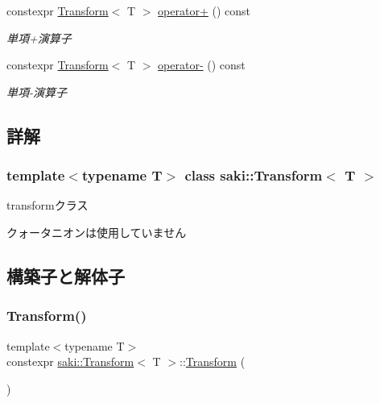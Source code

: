 \begin{DoxyCompactItemize}
constexpr \mbox{\hyperlink{classsaki_1_1_transform}{Transform}}$<$ T $>$ \mbox{\hyperlink{classsaki_1_1_transform_a52201fc4aed19cc0459dc4b3c21c3d37}{operator+}} () const
\begin{DoxyCompactList}\small\item\em 単項+演算子 \end{DoxyCompactList}\item 
constexpr \mbox{\hyperlink{classsaki_1_1_transform}{Transform}}$<$ T $>$ \mbox{\hyperlink{classsaki_1_1_transform_a813e5118f0a23213b21a6b7f101a4584}{operator-\/}} () const
\begin{DoxyCompactList}\small\item\em 単項-\/演算子 \end{DoxyCompactList}\end{DoxyCompactItemize}


\subsection{詳解}
\subsubsection*{template$<$typename T$>$\newline
class saki\+::\+Transform$<$ T $>$}

transformクラス 

クォータニオンは使用していません 

\subsection{構築子と解体子}
\mbox{\label{classsaki_1_1_transform_abdd7b5f310bccc56b804a2cf21890a35}} 
\subsubsection{\texorpdfstring{Transform()}{Transform()}\hspace{0.1cm}{\footnotesize\ttfamily [1/4]}}
{\footnotesize\ttfamily template$<$typename T$>$ \\
constexpr \mbox{\hyperlink{classsaki_1_1_transform}{saki\+::\+Transform}}$<$ T $>$\+::\mbox{\hyperlink{classsaki_1_1_transform}{Transform}} (\begin{DoxyParamCaption}{ }\end{DoxyParamCaption})\hspace{0.3cm}{\ttfamily [inline]}}



